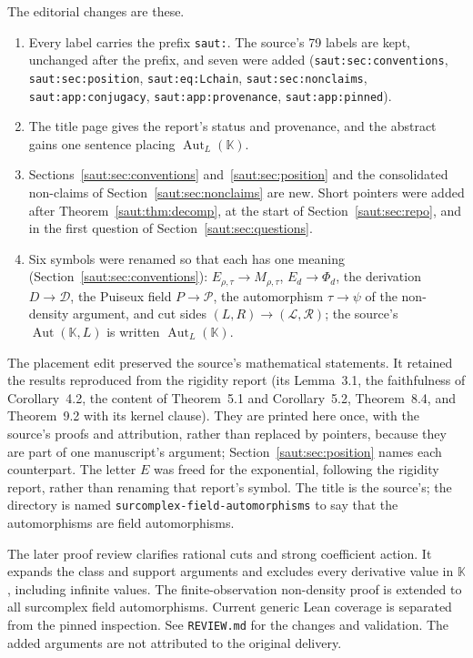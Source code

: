 \documentclass[11pt]{article}
\theoremstyle{definition}
\theoremstyle{remark}
\newcommand{\K}{\mathbb K}
\newcommand{\Aut}{\operatorname{Aut}}
\newcommand{\AutL}{\operatorname{Aut}_{L}}
\newcommand{\repo}[1]{\nolinkurl{#1}}%
\numberwithin{equation}{section}
\begin{document}
The editorial changes are these.
\begin{enumerate}[label=(\arabic*)]
\item Every label carries the prefix \texttt{saut:}. The source's 79 labels
are kept, unchanged after the prefix, and seven were added
(\texttt{saut:sec:conventions}, \texttt{saut:sec:position},
\texttt{saut:eq:Lchain}, \texttt{saut:sec:nonclaims},
\texttt{saut:app:conjugacy}, \texttt{saut:app:provenance},
\texttt{saut:app:pinned}).
\item The title page gives the report's status and provenance, and the
abstract gains one sentence placing $\AutL(\K)$.
\item Sections~\ref{saut:sec:conventions} and~\ref{saut:sec:position} and
the consolidated non-claims of Section~\ref{saut:sec:nonclaims} are new.
Short pointers were added after Theorem~\ref{saut:thm:decomp}, at the start
of Section~\ref{saut:sec:repo}, and in the first question of
Section~\ref{saut:sec:questions}.
\item Six symbols were renamed so that each has one meaning
(Section~\ref{saut:sec:conventions}): $E_{\rho,\tau}\to M_{\rho,\tau}$,
$E_d\to\Phi_d$, the derivation $D\to\mathcal D$, the Puiseux field
$P\to\mathcal P$, the automorphism $\tau\to\psi$ of the non-density
argument, and cut sides $(L,R)\to(\mathcal L,\mathcal R)$; the source's
$\Aut(\K,L)$ is written $\AutL(\K)$.
\end{enumerate}
The placement edit preserved the source's mathematical statements.
It retained the results reproduced from the rigidity report (its
Lemma~3.1, the faithfulness of Corollary~4.2, the content of
Theorem~5.1 and Corollary~5.2, Theorem~8.4, and Theorem~9.2 with its
kernel clause). They are printed here once, with the
source's proofs and attribution, rather than replaced by pointers, because
they are part of one manuscript's argument; Section~\ref{saut:sec:position}
names each counterpart. The letter $E$ was freed for the exponential,
following the rigidity report, rather than renaming that report's symbol.
The title is the source's; the directory is named
\texttt{surcomplex-field-automorphisms} to say that the automorphisms are
field automorphisms.

The later proof review clarifies rational cuts and strong coefficient action.
It expands the class and support arguments and excludes every derivative
value in $\K$, including infinite values. The finite-observation
non-density proof is extended to all surcomplex field automorphisms.
Current generic Lean coverage is separated from the pinned inspection.
See \repo{REVIEW.md} for the changes and validation.
The added arguments are not attributed to the original delivery.
\end{document}
